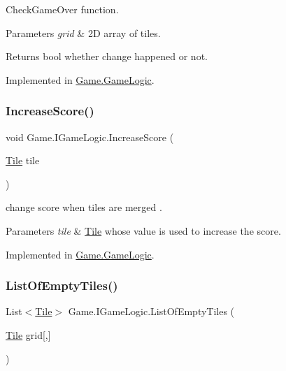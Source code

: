 Check\+Game\+Over function. 


\begin{DoxyParams}{Parameters}
{\em grid} & 2D array of tiles.\\
\hline
\end{DoxyParams}
\begin{DoxyReturn}{Returns}
bool whether change happened or not.
\end{DoxyReturn}


Implemented in \mbox{\hyperlink{class_game_1_1_game_logic_a11500e039be202e200db57b10afd7261}{Game.\+Game\+Logic}}.

\mbox{\label{interface_game_1_1_i_game_logic_a1a1127f02ceb601a80694ee69e25c0c7}} 
\subsubsection{\texorpdfstring{IncreaseScore()}{IncreaseScore()}}
{\footnotesize\ttfamily void Game.\+I\+Game\+Logic.\+Increase\+Score (\begin{DoxyParamCaption}\item[{\mbox{\hyperlink{class_game_1_1_tile}{Tile}}}]{tile }\end{DoxyParamCaption})}



change score when tiles are merged . 


\begin{DoxyParams}{Parameters}
{\em tile} & \mbox{\hyperlink{class_game_1_1_tile}{Tile}} whose value is used to increase the score.\\
\hline
\end{DoxyParams}


Implemented in \mbox{\hyperlink{class_game_1_1_game_logic_acfdb89870903c5855e4aeb437e9e9672}{Game.\+Game\+Logic}}.

\mbox{\label{interface_game_1_1_i_game_logic_a9453d57d56d6af99aaa89d2b946430f3}} 
\subsubsection{\texorpdfstring{ListOfEmptyTiles()}{ListOfEmptyTiles()}}
{\footnotesize\ttfamily List$<$\mbox{\hyperlink{class_game_1_1_tile}{Tile}}$>$ Game.\+I\+Game\+Logic.\+List\+Of\+Empty\+Tiles (\begin{DoxyParamCaption}\item[{\mbox{\hyperlink{class_game_1_1_tile}{Tile}}}]{grid\mbox{[},\mbox{]} }\end{DoxyParamCaption})}



